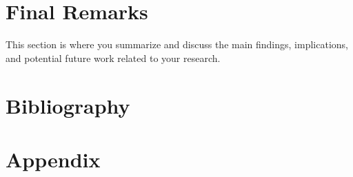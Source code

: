 \documentclass[
	12pt, 
	]{article}
\numberwithin{equation}{section}
\theoremstyle{definition}
\theoremstyle{plain}
\theoremstyle{plain}
\theoremstyle{plain}
\begin{document}
\lipsum[1]


\section{Final Remarks}

This section is where you summarize and discuss the main findings, implications, and potential future work related to your research.

\lipsum[1]

\newpage


\section*{Bibliography}

{	
	\onehalfspacing
	\printbibliography[heading=bibintoc]
}

\newpage


\appendix

\section{Appendix}


\end{document}

